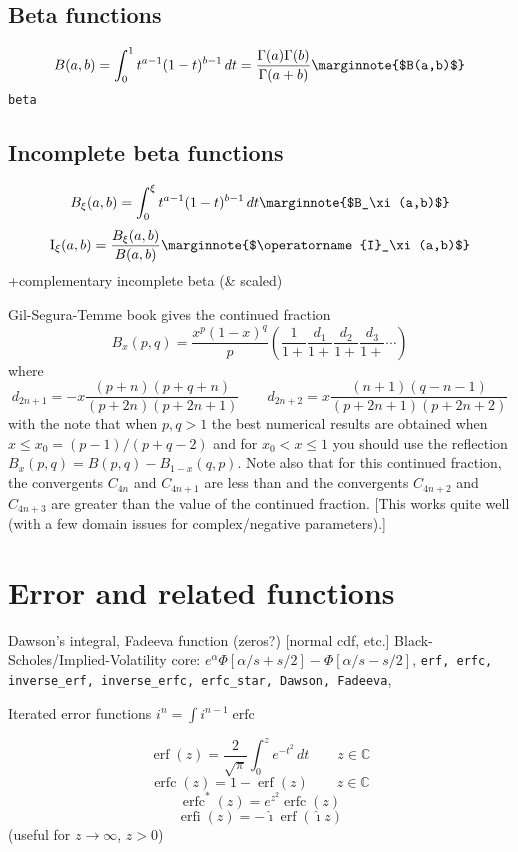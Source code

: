 \documentclass[10pt,dvipdfmx,letterpaper,twoside]{article}
\DeclareMathOperator{\erf}{erf}
\DeclareMathOperator{\erfc}{erfc}
\let\O=\operatorname
\newcommand{\CC}{{\mathbb{C}}}
\newcommand{\ii}{{\hat{\imath}}}
\let\DEF=\marginnote
\let\Beta=B
\let\al=\alpha
\let\Gam=\Gamma
\begin{document}
\subsection{Beta functions}

\[ \Beta(a,b) = \int_0^1 t^{a-1}(1-t)^{b-1}\,dt = \frac{\Gam(a) \Gam(b)}{\Gam(a+b)}     \DEF{$\Beta(a,b)$}\]
{\tt beta}

\subsection{Incomplete beta functions}

\[ \Beta_\xi(a,b) = \int_0^\xi t^{a-1}(1-t)^{b-1}\,dt     \DEF{$\Beta_\xi(a,b)$}\]
\[ \O{I}_\xi(a,b) = \frac{\Beta_\xi(a,b)}{\Beta(a,b)}     \DEF{$\O{I}_\xi(a,b)$}\]
+complementary incomplete beta (\& scaled)

Gil-Segura-Temme book gives the continued fraction
\[ \Beta_x(p,q) = \frac{x^p(1-x)^q}{p}\left( \frac{1}{1+} \frac{d_1}{1+} \frac{d_2}{1+} \frac{d_3}{1+} \cdots \right) \]
where
\[ d_{2n+1} = -x\frac{(p+n)(p+q+n)}{(p+2n)(p+2n+1)} \qquad d_{2n+2} = x\frac{(n+1)(q-n-1)}{(p+2n+1)(p+2n+2)} \]
with the note that when $p,q>1$ the best numerical results are obtained when $x\leq x_0 = (p-1)/(p+q-2)$ and for $x_0<x\leq1$
you should use the reflection $\Beta_x(p,q) = \Beta(p,q) - \Beta_{1-x}(q,p)$.
Note also that for this continued fraction,
the convergents $C_{4n}$ and $C_{4n+1}$ are less than
and the convergents $C_{4n+2}$ and $C_{4n+3}$ are greater than
the value of the continued fraction.
[This works quite well (with a few domain issues for complex/negative parameters).]

\section{Error and related functions}
Dawson's integral, Fadeeva function (zeros?) [normal cdf, etc.]
Black-Scholes/Implied-Volatility core: $e^\al\Phi[\al/s + s/2] - \Phi[\al/s - s/2]$,
{\tt erf, erfc, inverse\_erf, inverse\_erfc, erfc\_star, Dawson, Fadeeva},

Iterated error functions $i^n = \int i^{n-1}\erfc$

\[ \erf(z) = \frac{2}{\sqrt\pi}\int_0^z e^{-t^2}\,dt \qquad z\in\CC \]
\[ \erfc(z) = 1 - \erf(z) \qquad z\in\CC \]
\[ \erfc^*(z) = e^{z^2} \erfc(z) \]
\[ \O{erfi}(z) = -\ii\erf(\ii z) \]
(useful for $z\to\infty$, $z>0$)
\end{document}
